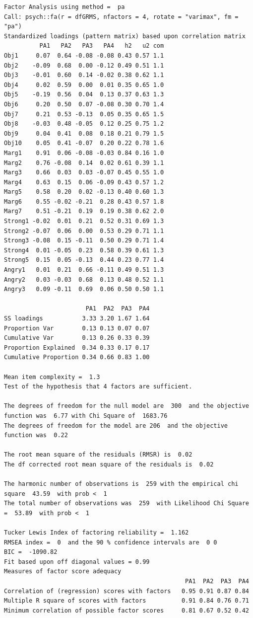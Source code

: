 \documentclass[
  english,
]{book}
\begin{document}
\begin{verbatim}
Factor Analysis using method =  pa
Call: psych::fa(r = dfGRMS, nfactors = 4, rotate = "varimax", fm = "pa")
Standardized loadings (pattern matrix) based upon correlation matrix
          PA1   PA2   PA3   PA4   h2   u2 com
Obj1     0.07  0.64 -0.08 -0.08 0.43 0.57 1.1
Obj2    -0.09  0.68  0.00 -0.12 0.49 0.51 1.1
Obj3    -0.01  0.60  0.14 -0.02 0.38 0.62 1.1
Obj4     0.02  0.59  0.00  0.01 0.35 0.65 1.0
Obj5    -0.19  0.56  0.04  0.13 0.37 0.63 1.3
Obj6     0.20  0.50  0.07 -0.08 0.30 0.70 1.4
Obj7     0.21  0.53 -0.13  0.05 0.35 0.65 1.5
Obj8    -0.03  0.48 -0.05  0.12 0.25 0.75 1.2
Obj9     0.04  0.41  0.08  0.18 0.21 0.79 1.5
Obj10    0.05  0.41 -0.07  0.20 0.22 0.78 1.6
Marg1    0.91  0.06 -0.08 -0.03 0.84 0.16 1.0
Marg2    0.76 -0.08  0.14  0.02 0.61 0.39 1.1
Marg3    0.66  0.03  0.03 -0.07 0.45 0.55 1.0
Marg4    0.63  0.15  0.06 -0.09 0.43 0.57 1.2
Marg5    0.58  0.20  0.02 -0.13 0.40 0.60 1.3
Marg6    0.55 -0.02 -0.21  0.28 0.43 0.57 1.8
Marg7    0.51 -0.21  0.19  0.19 0.38 0.62 2.0
Strong1 -0.02  0.01  0.21  0.52 0.31 0.69 1.3
Strong2 -0.07  0.06  0.00  0.53 0.29 0.71 1.1
Strong3 -0.08  0.15 -0.11  0.50 0.29 0.71 1.4
Strong4  0.01 -0.05  0.23  0.58 0.39 0.61 1.3
Strong5  0.15  0.05 -0.13  0.44 0.23 0.77 1.4
Angry1   0.01  0.21  0.66 -0.11 0.49 0.51 1.3
Angry2   0.03 -0.03  0.68  0.13 0.48 0.52 1.1
Angry3   0.09 -0.11  0.69  0.06 0.50 0.50 1.1

                       PA1  PA2  PA3  PA4
SS loadings           3.33 3.20 1.67 1.64
Proportion Var        0.13 0.13 0.07 0.07
Cumulative Var        0.13 0.26 0.33 0.39
Proportion Explained  0.34 0.33 0.17 0.17
Cumulative Proportion 0.34 0.66 0.83 1.00

Mean item complexity =  1.3
Test of the hypothesis that 4 factors are sufficient.

The degrees of freedom for the null model are  300  and the objective function was  6.77 with Chi Square of  1683.76
The degrees of freedom for the model are 206  and the objective function was  0.22 

The root mean square of the residuals (RMSR) is  0.02 
The df corrected root mean square of the residuals is  0.02 

The harmonic number of observations is  259 with the empirical chi square  43.59  with prob <  1 
The total number of observations was  259  with Likelihood Chi Square =  53.89  with prob <  1 

Tucker Lewis Index of factoring reliability =  1.162
RMSEA index =  0  and the 90 % confidence intervals are  0 0
BIC =  -1090.82
Fit based upon off diagonal values = 0.99
Measures of factor score adequacy             
                                                   PA1  PA2  PA3  PA4
Correlation of (regression) scores with factors   0.95 0.91 0.87 0.84
Multiple R square of scores with factors          0.91 0.84 0.76 0.71
Minimum correlation of possible factor scores     0.81 0.67 0.52 0.42
\end{verbatim}
\end{document}
